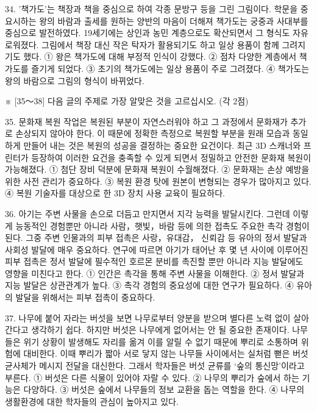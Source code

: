 \documentclass[12pt]{article}
\begin{document}
\begin{enumerate}[1.]
34.
  '책가도’는 책장과 책을 중심으로 하여 각종 문방구 등을 그린 그림이다.
학문을 중요시하는 왕의 바람과 출세를 원하는 양반의 마음이 더해져
책가도는 궁중과 사대부를 중심으로 발전하였다. 19세기에는 상인과 농민
계층으로도 확산되면서 그 형식도 자유로워졌다. 그림에서 책장 대신 작은
탁자가 활용되기도 하고 일상 용품이 함께 그려지기도 했다.
① 왕은 책가도에 대해 부정적 인식이 강했다.
② 점차 다양한 계층에서 책가도를 즐기게 되었다.
③ 초기의 책가도에는 일상 용품이 주로 그려졌다.
④ 책가도는 왕의 바람으로 그림의 형식이 바뀌었다.




※ [35～38] 다음 글의 주제로 가장 알맞은 것을 고르십시오. (각 2점)

35.
  문화재 복원 작업은 복원된 부분이 자연스러워야 하고 그 과정에서
문화재가 추가로 손상되지 않아야 한다. 이 때문에 정확한 측정으로 복원할
부분을 원래 모습과 동일하게 만들어 내는 것은 복원의 성공을 결정하는
중요한 요건이다. 최근 3D 스캐너와 프린터가 등장하여 이러한 요건을
충족할 수 있게 되면서 정밀하고 안전한 문화재 복원이 가능해졌다.
① 첨단 장비 덕분에 문화재 복원이 수월해졌다.
② 문화재는 손상 예방을 위한 사전 관리가 중요하다.
③ 복원 환경 탓에 원본이 변형되는 경우가 많아지고 있다.
④ 복원 기술자를 대상으로 한 3D 장치 사용 교육이 필요하다.


36.
  아기는 주변 사물을 손으로 더듬고 만지면서 지각 능력을 발달시킨다.
그런데 이렇게 능동적인 경험뿐만 아니라 사람，햇빛，바람 등에 의한 접촉도
주요한 촉각 경험이 된다. 그중 주변 인물과의 피부 접촉은 사랑，유대감，
신뢰감 등 유아의 정서 발달과 사회성 발달에 매우 중요하다. 연구에 따르면
아기가 태어난 후 몇 년 사이에 이루어진 피부 접촉은 정서 발달에 필수적인
호르몬 분비를 촉진할 뿐만 아니라 지능 발달에도 영향을 미친다고 한다.
① 인간은 촉각을 통해 주변 사물을 이해한다.
② 정서 발달과 지능 발달은 상관관계가 높다.
③ 촉각 경험의 중요성에 대한 연구가 필요하다.
④ 유아의 발달을 위해서는 피부 접촉이 중요하다.


37.
  나무에 붙어 자라는 버섯을 보면 나무로부터 양분을 받으며 별다른 노력
없이 살아간다고 생각하기 쉽다. 하지만 버섯은 나무에게 없어서는 안 될
중요한 존재이다. 나무들은 위기 상황이 발생해도 자리를 옮겨 이를 알릴
수 없기 때문에 뿌리로 소통하며 위험에 대비한다. 이때 뿌리가 짧아 서로
닿지 않는 나무들 사이에서는 실처럼 뻗은 버섯 균사체가 메시지 전달을
대신한다. 그래서 학자들은 버섯 균류를 ‘숲의 통신망’이라고 부른다.
① 버섯은 다른 식물이 있어야 자랄 수 있다.
② 나무의 뿌리가 숲에서 하는 기능은 다양하다.
③ 버섯은 숲에서 나무들의 정보 교환을 돕는 역할을 한다.
④ 나무의 생활환경에 대한 학자들의 관심이 높아지고 있다.



\end{enumerate}
\end{document}
